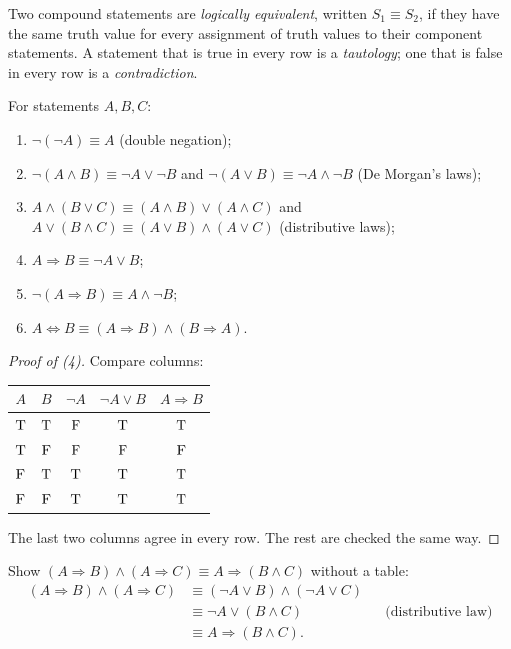 \begin{definition}
Two compound statements are \emph{logically equivalent}, written $S_1 \equiv S_2$, if they
have the same truth value for every assignment of truth values to their component
statements. A statement that is true in every row is a \emph{tautology}; one that is false
in every row is a \emph{contradiction}.
\end{definition}

\begin{proposition}
For statements $A,B,C$:
\begin{enumerate}
  \item $\neg(\neg A) \equiv A$ (double negation);
  \item $\neg(A\wedge B) \equiv \neg A \vee \neg B$ and $\neg(A \vee B) \equiv \neg A
        \wedge \neg B$ (De Morgan's laws);
  \item $A \wedge (B \vee C) \equiv (A\wedge B)\vee(A\wedge C)$ and
        $A \vee (B \wedge C) \equiv (A\vee B)\wedge(A\vee C)$ (distributive laws);
  \item $A \Rightarrow B \equiv \neg A \vee B$;
  \item $\neg(A \Rightarrow B) \equiv A \wedge \neg B$;
  \item $A \Leftrightarrow B \equiv (A\Rightarrow B)\wedge(B \Rightarrow A)$.
\end{enumerate}
\end{proposition}

\begin{proof}[Proof of (4)]
Compare columns:
\begin{center}
\begin{tabular}{cc|cc|c}
$A$ & $B$ & $\neg A$ & $\neg A \vee B$ & $A \Rightarrow B$ \\
\hline
$\mathrm{T}$ & $\mathrm{T}$ & $\mathrm{F}$ & $\mathrm{T}$ & $\mathrm{T}$\\
$\mathrm{T}$ & $\mathrm{F}$ & $\mathrm{F}$ & $\mathrm{F}$ & $\mathrm{F}$\\
$\mathrm{F}$ & $\mathrm{T}$ & $\mathrm{T}$ & $\mathrm{T}$ & $\mathrm{T}$\\
$\mathrm{F}$ & $\mathrm{F}$ & $\mathrm{T}$ & $\mathrm{T}$ & $\mathrm{T}$\\
\end{tabular}
\end{center}
The last two columns agree in every row. The rest are checked the same way.
\end{proof}

\begin{example}
Show $(A \Rightarrow B)\wedge(A \Rightarrow C) \equiv A \Rightarrow (B\wedge C)$ without a
table:
\begin{align*}
(A \Rightarrow B)\wedge(A \Rightarrow C)
  &\equiv (\neg A \vee B)\wedge(\neg A \vee C) \\
  &\equiv \neg A \vee (B \wedge C) &&\text{(distributive law)}\\
  &\equiv A \Rightarrow (B \wedge C).
\end{align*}
\end{example}

